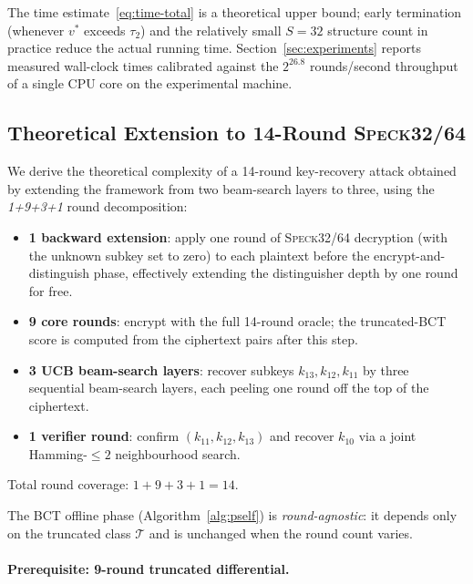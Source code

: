 \documentclass[runningheads]{llncs}
\newcommand{\speck}{\textsc{Speck}32/64}
\begin{document}
\begin{remark}
  The time estimate~\eqref{eq:time-total} is a theoretical upper bound;
  early termination (whenever $v^*$ exceeds $\tau_2$) and the
  relatively small $S = 32$ structure count in practice reduce the
  actual running time.  Section~\ref{sec:experiments} reports measured
  wall-clock times calibrated against the $2^{26.8}$ rounds/second
  throughput of a single CPU core on the experimental machine.
\end{remark}

\subsection{Theoretical Extension to 14-Round \speck{}}
\label{subsec:14round}

We derive the theoretical complexity of a 14-round key-recovery
attack obtained by extending the framework from two beam-search layers
to three, using the \emph{1+9+3+1} round decomposition:
\begin{itemize}
  \item \textbf{1 backward extension}: apply one round of
    \speck{} decryption (with the unknown subkey set to zero) to each
    plaintext before the encrypt-and-distinguish phase, effectively
    extending the distinguisher depth by one round for free.
  \item \textbf{9 core rounds}: encrypt with the full 14-round
    oracle; the truncated-BCT score is computed from the ciphertext
    pairs after this step.
  \item \textbf{3 UCB beam-search layers}: recover subkeys
    $k_{13},k_{12},k_{11}$ by three sequential beam-search layers,
    each peeling one round off the top of the ciphertext.
  \item \textbf{1 verifier round}: confirm $(k_{11},k_{12},k_{13})$
    and recover $k_{10}$ via a joint Hamming-$\le 2$ neighbourhood
    search.
\end{itemize}
Total round coverage: $1+9+3+1 = 14$.

The BCT offline phase (Algorithm~\ref{alg:pself}) is
\emph{round-agnostic}: it depends only on the truncated class
$\mathcal{T}$ and is unchanged when the round count varies.

\paragraph{Prerequisite: 9-round truncated differential.}
\end{document}
